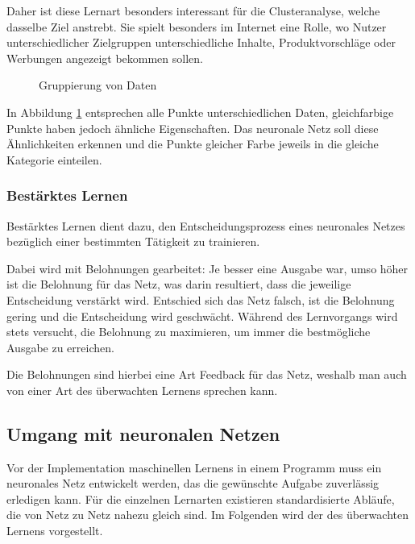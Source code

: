\documentclass[12pt,a4]{article}
\begin{document}
Daher ist diese Lernart besonders interessant für die Clusteranalyse, welche dasselbe Ziel anstrebt. Sie spielt besonders im Internet eine Rolle, wo Nutzer unterschiedlicher Zielgruppen unterschiedliche Inhalte, Produktvorschläge oder Werbungen angezeigt bekommen sollen.

\begin{figure}[!h]
\centering
{}
\caption{Gruppierung von Daten}
\label{fig:UnsupervisedLearning}
\end{figure}

In Abbildung \ref{fig:UnsupervisedLearning} entsprechen alle Punkte unterschiedlichen Daten, gleichfarbige Punkte haben jedoch ähnliche Eigenschaften. Das neuronale Netz soll diese Ähnlichkeiten erkennen und die Punkte gleicher Farbe jeweils in die gleiche Kategorie einteilen.

\subsubsection{Bestärktes Lernen}
Bestärktes Lernen dient dazu, den Entscheidungsprozess eines neuronales Netzes bezüglich einer bestimmten Tätigkeit zu trainieren.

Dabei wird mit Belohnungen gearbeitet: Je besser eine Ausgabe war, umso höher ist die Belohnung für das Netz, was darin resultiert, dass die jeweilige Entscheidung verstärkt wird. Entschied sich das Netz falsch, ist die Belohnung gering und die Entscheidung wird geschwächt. Während des Lernvorgangs wird stets versucht, die Belohnung zu maximieren, um immer die bestmögliche Ausgabe zu erreichen.

Die Belohnungen sind hierbei eine Art Feedback für das Netz, weshalb man auch von einer Art des überwachten Lernens sprechen kann.

\subsection{Umgang mit neuronalen Netzen \cite{PythonMachineLearningChapter1}}
Vor der Implementation maschinellen Lernens in einem Programm muss ein neuronales Netz entwickelt werden, das die gewünschte Aufgabe zuverlässig erledigen kann. Für die einzelnen Lernarten existieren standardisierte Abläufe, die von Netz zu Netz nahezu gleich sind. Im Folgenden wird der des überwachten Lernens vorgestellt.
\end{document}
